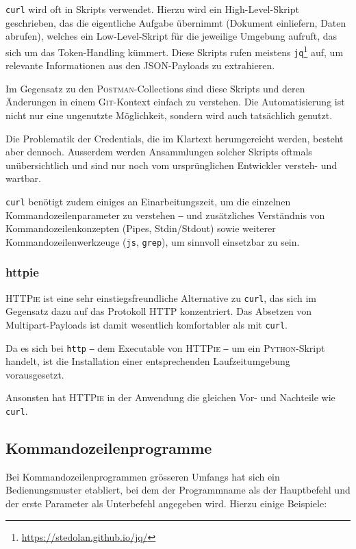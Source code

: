 \texttt{curl} wird oft in Skripts verwendet. Hierzu wird ein High-Level-Skript geschrieben, das die eigentliche Aufgabe übernimmt (Dokument einliefern, Daten abrufen), welches ein Low-Level-Skript für die jeweilige Umgebung aufruft, das sich um das Token-Handling kümmert. Diese Skripts rufen meistens \texttt{jq}\footnote{\url{https://stedolan.github.io/jq/}} auf, um relevante Informationen aus den JSON-Payloads zu extrahieren.

Im Gegensatz zu den \textsc{Postman}-Collections sind diese Skripts und deren Änderungen in einem \textsc{Git}-Kontext einfach zu verstehen. Die Automatisierung ist nicht nur eine ungenutzte Möglichkeit, sondern wird auch tatsächlich genutzt.

Die Problematik der Credentials, die im Klartext herumgereicht werden, besteht aber dennoch. Ausserdem werden Ansammlungen solcher Skripts oftmals unübersichtlich und sind nur noch vom ursprünglichen Entwickler versteh- und wartbar.

\texttt{curl} benötigt zudem einiges an Einarbeitungszeit, um die einzelnen Kommandozeilenparameter zu verstehen ‒ und zusätzliches Verständnis von Kommandozeilenkonzepten (Pipes, Stdin/Stdout) sowie weiterer Kommandozeilenwerkzeuge (\texttt{js}, \texttt{grep}), um sinnvoll einsetzbar zu sein.

\subsubsection{httpie}

\textsc{HTTPie} ist eine sehr einstiegsfreundliche Alternative zu \texttt{curl}, das sich im Gegensatz dazu auf das Protokoll HTTP konzentriert. Das Absetzen von Multipart-Payloads ist damit wesentlich komfortabler als mit \texttt{curl}.

Da es sich bei \texttt{http} ‒ dem Executable von \textsc{HTTPie} ‒ um ein \textsc{Python}-Skript handelt, ist die Installation einer entsprechenden Laufzeitumgebung vorausgesetzt.

Ansonsten hat \textsc{HTTPie} in der Anwendung die gleichen Vor- und Nachteile wie \texttt{curl}.

\subsection{Kommandozeilenprogramme}

Bei Kommandozeilenprogrammen grösseren Umfangs hat sich ein Bedienungsmuster etabliert, bei dem der Programmname als der Hauptbefehl und der erste Parameter als Unterbefehl angegeben wird. Hierzu einige Beispiele:

